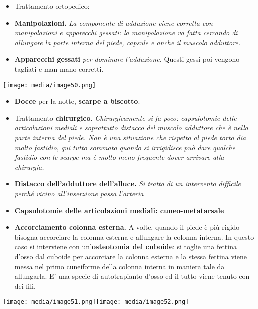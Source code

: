 \documentclass[]{article}
\begin{document}
\begin{itemize}
\item
  Trattamento ortopedico:
\end{itemize}

\begin{itemize}
\item
  \textbf{Manipolazioni.} \emph{La componente di adduzione viene
  corretta con manipolazioni e apparecchi gessati: la manipolazione va
  fatta cercando di allungare la parte interna del piede, capsule e
  anche il muscolo adduttore.}
\item
  \textbf{Apparecchi gessati} \emph{per dominare l'adduzione.} Questi
  gessi poi vengono tagliati e man mano corretti.
\end{itemize}

\texttt{[image: media/image50.png]}

\begin{itemize}
\item
  \textbf{Docce} per la notte, \textbf{scarpe a biscotto}.
\end{itemize}

\begin{itemize}
\item
  Trattamento \textbf{chirurgico}. \emph{Chirurgicamente si fa poco:
  capsulotomie delle articolazioni mediali e soprattutto distacco del
  muscolo adduttore che è nella parte interna del piede. Non è una
  situazione che rispetto al piede torto dia molto fastidio, qui tutto
  sommato quando si irrigidisce può dare qualche fastidio con le scarpe
  ma è molto meno frequente dover arrivare alla chirurgia.}
\end{itemize}

\begin{itemize}
\item
  \textbf{Distacco dell'adduttore dell'alluce.} \emph{Si tratta di un
  intervento difficile perché vicino all'inserzione passa l'arteria}
\item
  \textbf{Capsulotomie delle articolazioni mediali: cuneo-metatarsale}
\item
  \textbf{Accorciamento colonna esterna.} A volte, quando il piede è più
  rigido bisogna accorciare la colonna esterna e allungare la colonna
  interna. In questo caso si interviene con un'\textbf{osteotomia del
  cuboide}: si toglie una fettina d'osso dal cuboide per accorciare la
  colonna esterna e la stessa fettina viene messa nel primo cuneiforme
  della colonna interna in maniera tale da allungarla. E' una specie di
  autotrapianto d'osso ed il tutto viene tenuto con dei fili.
\end{itemize}

\texttt{[image: media/image51.png]}\texttt{[image: media/image52.png]}
\end{document}
